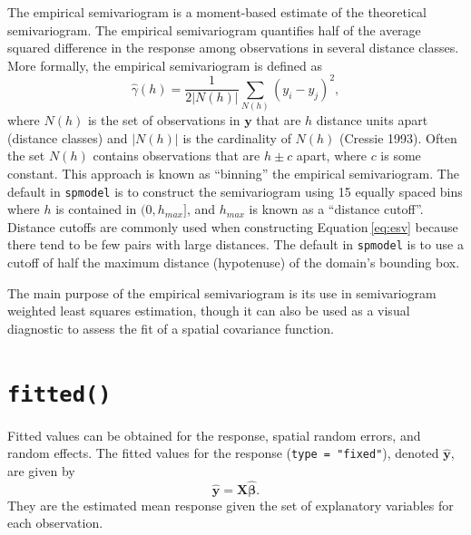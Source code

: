\documentclass{article}
\begin{document}
The empirical semivariogram is a moment-based estimate of the
theoretical semivariogram. The empirical semivariogram quantifies half
of the average squared difference in the response among observations in
several distance classes. More formally, the empirical semivariogram is
defined as \begin{equation}\label{eq:esv}
  \hat{\gamma}(h) = \frac{1}{2|N(h)|} \sum_{N(h)} (y_i - y_j)^2, 
\end{equation} where \(N(h)\) is the set of observations in
\(\mathbf{y}\) that are \(h\) distance units apart (distance classes)
and \(|N(h)|\) is the cardinality of \(N(h)\) (Cressie 1993). Often the
set \(N(h)\) contains observations that are \(h \pm c\) apart, where
\(c\) is some constant. This approach is known as ``binning'' the
empirical semivariogram. The default in \texttt{spmodel} is to construct
the semivariogram using 15 equally spaced bins where \(h\) is contained
in \((0, h_{max}]\), and \(h_{max}\) is known as a ``distance cutoff''.
Distance cutoffs are commonly used when constructing
Equation\(~\)\ref{eq:esv} because there tend to be few pairs with large
distances. The default in \texttt{spmodel} is to use a cutoff of half
the maximum distance (hypotenuse) of the domain's bounding box.

The main purpose of the empirical semivariogram is its use in
semivariogram weighted least squares estimation, though it can also be
used as a visual diagnostic to assess the fit of a spatial covariance
function.

\hypertarget{sec:fitted}{%
\section{\texorpdfstring{\texttt{fitted()}}{fitted()}}\label{sec:fitted}}

Fitted values can be obtained for the response, spatial random errors,
and random effects. The fitted values for the response
(\texttt{type\ =\ "fixed"}), denoted \(\mathbf{\hat{y}}\), are given by
\begin{equation*}\label{eq:fit_resp}
  \mathbf{\hat{y}} = \mathbf{X} \boldsymbol{\hat{\beta}} .
\end{equation*} They are the estimated mean response given the set of
explanatory variables for each observation.
\end{document}
